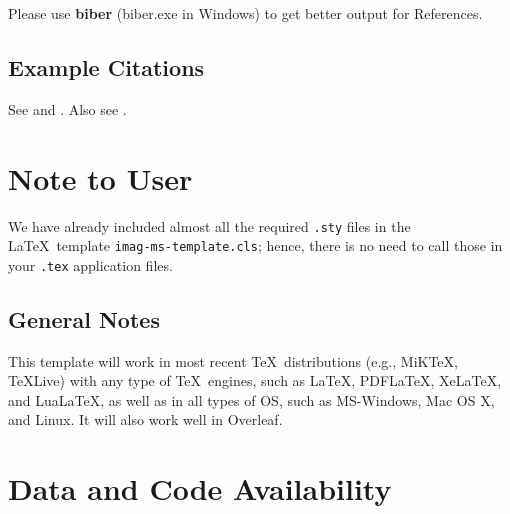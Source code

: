 \documentclass[]{imag-ms-template}
\begin{document}
\bigskip

 Please use {\bf biber} (biber.exe in Windows) to get
better output for References.

\nocite{*}

\subsection{Example Citations}

See \cite{Einstein1905} and \cite{Goossens1993,Knuth1986}. Also see \cite{Chen2023}.


\section{Note to User}

We have already included almost all the required \texttt{.sty} files in the
\LaTeX\ template \verb!imag-ms-template.cls!; hence, there is no need to call those in
your \texttt{.tex} application files.

%
%
%
%

\subsection*{General Notes}

\noindent This template will work in most recent \TeX\ distributions
(e.g., MiKTeX, TeXLive) with any type of \TeX\ engines, such as
\LaTeX, PDF\LaTeX, Xe\LaTeX, and Lua\LaTeX, as well as in all types of OS, such
as MS-Windows, Mac OS X, and Linux. It will also work well in Overleaf.

\section*{Data and Code Availability}
\end{document}

